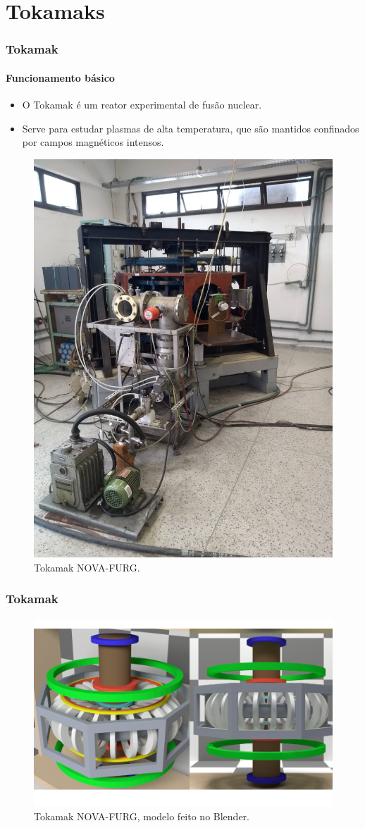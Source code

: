 \documentclass[aspectratio=169]{beamer}
\begin{document}
\section{Tokamaks}
	\begin{frame}
		\frametitle{Tokamak}
		\framesubtitle{Funcionamento básico}
		\begin{minipage}[h]{.4\textwidth}
		\begin{itemize}
		\item  O Tokamak é um reator experimental de
fusão nuclear.
\item  Serve para estudar plasmas de alta temperatura, que são mantidos confinados por campos magnéticos intensos.
		\end{itemize}
			\end{minipage}
		\hfill
		\begin{minipage}[h]{.55\textwidth}
			\begin{figure}
						\centering
			\includegraphics[width=.55\linewidth]{tokamak.jpeg} 
			\caption{Tokamak NOVA-FURG.}
			\end{figure} 	
			\end{minipage}
	\end{frame}	
	
	\begin{frame}
		\frametitle{Tokamak}
			\begin{figure}[H]
				\centering
			\includegraphics[width=.65\linewidth]{tokamak12.png} 
				\caption{Tokamak NOVA-FURG, modelo feito no Blender.}
		
			\end{figure}	
	\end{frame}
\end{document}

